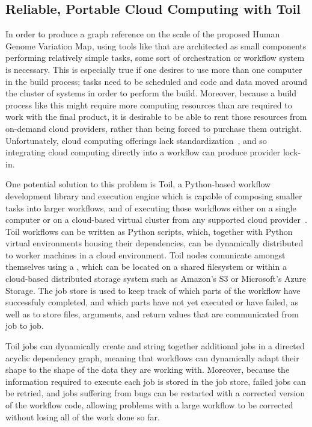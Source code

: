 \subsection{Reliable, Portable Cloud Computing with Toil}


In order to produce a graph reference on the scale of the proposed Human Genome Variation Map, using tools like \vg that are architected as small components performing relatively simple tasks, some sort of orchestration or workflow system is necessary. This is especially true if one desires to use more than one computer in the build process; tasks need to be scheduled and code and data moved around the cluster of systems in order to perform the build. Moreover, because a build process like this might require more computing resources than are required to work with the final product, it is desirable to be able to rent those resources from on-demand cloud providers, rather than being forced to purchase them outright. Unfortunately, cloud computing offerings lack standardization~\cite{ortiz2011problem}, and so integrating cloud computing directly into a workflow can produce provider lock-in.

One potential solution to this problem is Toil, a Python-based workflow development library and execution engine which is capable of composing smaller tasks into larger workflows, and of executing those workflows either on a single computer or on a cloud-based virtual cluster from any supported cloud provider~\cite{vivian2017toil}. Toil workflows can be written as Python scripts, which, together with Python virtual environments housing their dependencies, can be dynamically distributed to worker machines in a cloud environment. Toil nodes comunicate amongst themselves using a , which can be located on a shared filesystem or within a cloud-based distributed storage system such as Amazon's S3 or Microsoft's Azure Storage. The job store is used to keep track of which parts of the workflow have successfuly completed, and which parts have not yet executed or have failed, as well as to store files, arguments, and return values that are communicated from job to job.

Toil jobs can dynamically create and string together additional jobs in a directed acyclic dependency graph, meaning that workflows can dynamically adapt their shape to the shape of the data they are working with. Moreover, because the information required to execute each job is stored in the job store, failed jobs can be retried, and jobs suffering from bugs can be restarted with a corrected version of the workflow code, allowing problems with a large workflow to be corrected without losing all of the work done so far.


